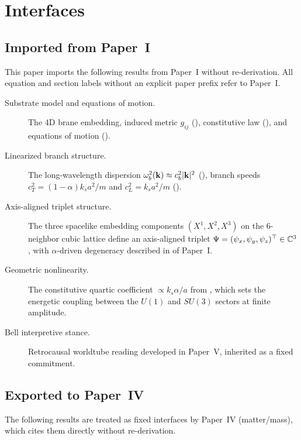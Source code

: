 \section{Interfaces}
\label{sec:interfaces}

\subsection*{Imported from Paper~I}

This paper imports the following results from Paper~I without re-derivation.
All equation and section labels without an explicit paper prefix refer to Paper~I.

\begin{description}
  \item[\normalfont Substrate model and equations of motion.]
  The 4D brane embedding, induced metric $g_{ij}$ (), constitutive law
  (), and equations of motion ().

  \item[\normalfont Linearized branch structure.]
  The long-wavelength dispersion $\omega_b^2(\mathbf{k})\approx c_b^2|\mathbf{k}|^2$
  (), branch speeds $c_T^2=(1-\alpha)k_s a^2/m$ and
  $c_L^2=k_s a^2/m$ ().

  \item[\normalfont Axis-aligned triplet structure.]
  The three spacelike embedding components $(X^1,X^2,X^3)$ on the 6-neighbor cubic lattice
  define an axis-aligned triplet $\Psi=(\psi_x,\psi_y,\psi_z)^\top\in\mathbb{C}^3$, with
  $\alpha$-driven degeneracy described in  of Paper~I.

  \item[\normalfont Geometric nonlinearity.]
  The constitutive quartic coefficient $\propto k_s\alpha/a$ from , which sets
  the energetic coupling between the $U(1)$ and $SU(3)$ sectors at finite amplitude.

  \item[\normalfont Bell interpretive stance.]
  Retrocausal worldtube reading developed in Paper~V, inherited as
  a fixed commitment.
\end{description}

\subsection*{Exported to Paper~IV}

The following results are treated as fixed interfaces by Paper~IV (matter/mass), which cites
them directly without re-derivation.

